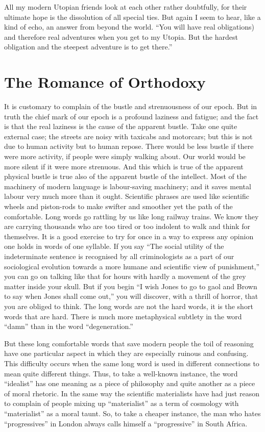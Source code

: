 \documentclass{book}
\begin{document}
All my modern Utopian friends look at each other rather doubtfully, for their ultimate hope is the dissolution of all special ties. But again I seem to hear, like a kind of echo, an answer from beyond the world. “You will have real obligations) and therefore real adventures when you get to my Utopia. But the hardest obligation and the steepest adventure is to get there.”

\chapter{The Romance of Orthodoxy}
\label{chapter-7}
It is customary to complain of the bustle and strenuousness of our epoch. But in truth the chief mark of our epoch is a profound laziness and fatigue; and the fact is that the real laziness is the cause of the apparent bustle. Take one quite external case; the streets are noisy with taxicabs and motorcars; but this is not due to human activity but to human repose. There would be less bustle if there were more activity, if people were simply walking about. Our world would be more silent if it were more strenuous. And this which is true of the apparent physical bustle is true also of the apparent bustle of the intellect. Most of the machinery of modern language is labour-saving machinery; and it saves mental labour very much more than it ought. Scientific phrases are used like scientific wheels and piston-rods to make swifter and smoother yet the path of the comfortable. Long words go rattling by us like long railway trains. We know they are carrying thousands who are too tired or too indolent to walk and think for themselves. It is a good exercise to try for once in a way to express any opinion one holds in words of one syllable. If you say “The social utility of the indeterminate sentence is recognised by all criminologists as a part of our sociological evolution towards a more humane and scientific view of punishment,” you can go on talking like that for hours with hardly a movement of the grey matter inside your skull. But if you begin “I wish Jones to go to gaol and Brown to say when Jones shall come out,” you will discover, with a thrill of horror, that you are obliged to think. The long words are not the hard words, it is the short words that are hard. There is much more metaphysical subtlety in the word “damn” than in the word “degeneration.”

But these long comfortable words that save modern people the toil of reasoning have one particular aspect in which they are especially ruinous and confusing. This difficulty occurs when the same long word is used in different connections to mean quite different things. Thus, to take a well-known instance, the word “idealist” has one meaning as a piece of philosophy and quite another as a piece of moral rhetoric. In the same way the scientific materialists have had just reason to complain of people mixing up “materialist” as a term of cosmology with “materialist” as a moral taunt. So, to take a cheaper instance, the man who hates “progressives” in London always calls himself a “progressive” in South Africa.
\end{document}
